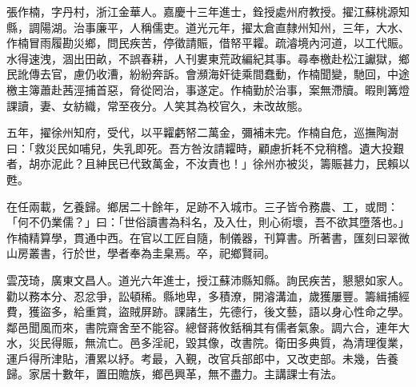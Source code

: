 \begin{pinyinscope}
張作楠，字丹村，浙江金華人。嘉慶十三年進士，銓授處州府教授。擢江蘇桃源知縣，調陽湖。治事廉平，人稱儒吏。道光元年，擢太倉直隸州知州，三年，大水、作楠冒雨履勘災鄉，問民疾苦，停徵請賑，借帑平糶。疏濬境內河道，以工代賑。水得速洩，涸出田畝，不誤春耕，人刊婁東荒政編紀其事。尋奉檄赴松江讞獄，鄉民訛傳去官，慮仍收漕，紛紛奔訴。會瀕海奸徒乘間蠢動，作楠聞變，馳回，中途檄主簿蕭赴茜涇捕首惡，脅從罔治，事遂定。作楠勤於治事，案無滯牘。暇則篝燈課讀，妻、女紡織，常至夜分。人笑其為校官久，未改故態。

五年，擢徐州知府，受代，以平糶虧帑二萬金，彌補未完。作楠自危，巡撫陶澍曰：「救災民如哺兒，失乳即死。吾方咎汝請糶時，顧慮折耗不兌稍稽。遺大投艱者，胡亦泥此？且紳民已代致萬金，不汝責也！」徐州亦被災，籌賑甚力，民賴以甦。

在任兩載，乞養歸。鄉居二十餘年，足跡不入城市。三子皆令務農、工，或問：「何不仍業儒？」曰：「世俗讀書為科名，及入仕，則心術壞，吾不欲其墮落也。」作楠精算學，貫通中西。在官以工匠自隨，制儀器，刊算書。所著書，匯刻曰翠微山房叢書，行於世，學者奉為圭臬焉。卒，祀鄉賢祠。

雲茂琦，廣東文昌人。道光六年進士，授江蘇沛縣知縣。詢民疾苦，懇懇如家人。勸以務本分、忍忿爭，訟頓稀。縣地卑，多積潦，開濬溝洫，歲獲屢豐。籌緝捕經費，獲盜多，給重賞，盜賊屏跡。課諸生，先德行，後文藝，語以身心性命之學。鄰邑聞風而來，書院齋舍至不能容。總督蔣攸銛稱其有儒者氣象。調六合，連年大水，災民得賑，無流亡。邑多淫祀，毀其像，改書院。衛田多典質，為清理復業，運戶得所津貼，漕累以紓。考最，入覲，改官兵部郎中，又改吏部。未幾，告養歸。家居十數年，置田贍族，鄉邑興革，無不盡力。主講課士有法。


\end{pinyinscope}
